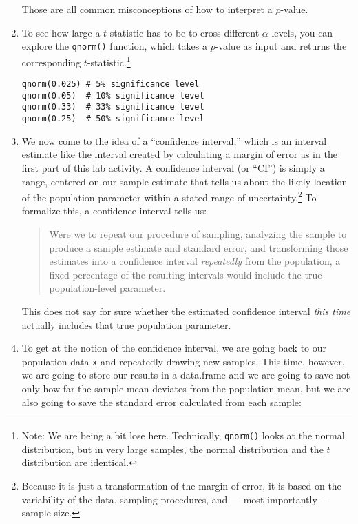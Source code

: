\documentclass[a4paper,12pt]{article}
\begin{document}
\begin{enumerate}
\noindent Those are all common misconceptions of how to interpret a $p$-value.

\item To see how large a $t$-statistic has to be to cross different $\alpha$ levels, you can explore the \texttt{qnorm()} function, which takes a $p$-value as input and returns the corresponding $t$-statistic.\footnote{Note: We are being a bit lose here. Technically, \texttt{qnorm()} looks at the normal distribution, but in very large samples, the normal distribution and the $t$ distribution are identical.}

\begin{verbatim}
qnorm(0.025) # 5% significance level
qnorm(0.05)  # 10% significance level
qnorm(0.33)  # 33% significance level
qnorm(0.25)  # 50% significance level
\end{verbatim}

\item We now come to the idea of a ``confidence interval,'' which is an interval estimate like the interval created by calculating a margin of error as in the first part of this lab activity. A confidence interval (or ``CI'') is simply a range, centered on our sample estimate that tells us about the likely location of the population parameter within a stated range of uncertainty.\footnote{Because it is just a transformation of the margin of error, it is based on the variability of the data, sampling procedures, and --- most importantly --- sample size.} To formalize this, a confidence interval tells us:

\begin{quote}
Were we to repeat our procedure of sampling, analyzing the sample to produce a sample estimate and standard error, and transforming those estimates into a confidence interval \textit{repeatedly} from the population, a fixed percentage of the resulting intervals would include the true population-level parameter.
\end{quote}
        
\noindent This does not say for sure whether the estimated confidence interval \textit{this time} actually includes that true population parameter.

\clearpage 

\item To get at the notion of the confidence interval, we are going back to our population data \texttt{x} and repeatedly drawing new samples. This time, however, we are going to store our results in a data.frame and we are going to save not only how far the sample mean deviates from the population mean, but we are also going to save the standard error calculated from each sample:


\end{enumerate}
\end{document}

